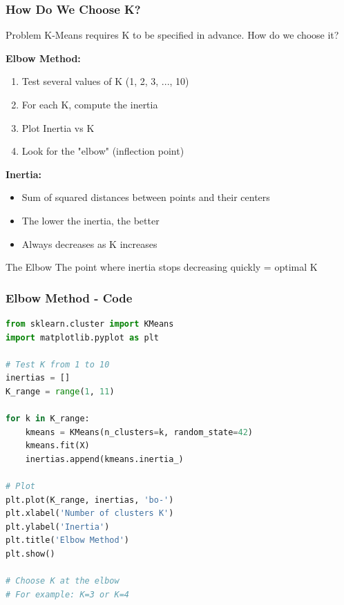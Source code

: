 \documentclass{beamer}
\begin{document}
\begin{frame}
\frametitle{How Do We Choose K?}
\begin{block}{Problem}
K-Means requires K to be specified in advance. How do we choose it?
\end{block}

\vspace{0.5em}
\textbf{Elbow Method:}
\begin{enumerate}
    \item Test several values of K (1, 2, 3, ..., 10)
    \item For each K, compute the inertia
    \item Plot Inertia vs K
    \item Look for the "elbow" (inflection point)
\end{enumerate}

\vspace{0.5em}
\textbf{Inertia:}
\begin{itemize}
    \item Sum of squared distances between points and their centers
    \item The lower the inertia, the better
    \item Always decreases as K increases
\end{itemize}

\vspace{0.5em}
\begin{alertblock}{The Elbow}
The point where inertia stops decreasing quickly = optimal K
\end{alertblock}
\end{frame}

\begin{frame}[fragile]
\frametitle{Elbow Method - Code}
\begin{lstlisting}[language=Python]
from sklearn.cluster import KMeans
import matplotlib.pyplot as plt

# Test K from 1 to 10
inertias = []
K_range = range(1, 11)

for k in K_range:
    kmeans = KMeans(n_clusters=k, random_state=42)
    kmeans.fit(X)
    inertias.append(kmeans.inertia_)

# Plot
plt.plot(K_range, inertias, 'bo-')
plt.xlabel('Number of clusters K')
plt.ylabel('Inertia')
plt.title('Elbow Method')
plt.show()

# Choose K at the elbow
# For example: K=3 or K=4
\end{lstlisting}
\end{frame}
\end{document}
